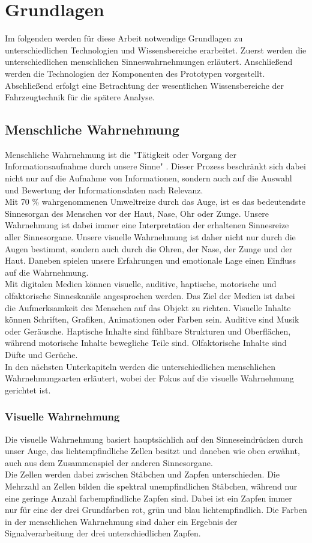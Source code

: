 \chapter{Grundlagen}
\label{cha:Grundlagen}
Im folgenden werden für diese Arbeit notwendige Grundlagen zu unterschiedlichen Technologien und Wissensbereiche erarbeitet. Zuerst werden die unterschiedlichen menschlichen Sinneswahrnehmungen erläutert. Anschließend werden die Technologien der Komponenten des Prototypen vorgestellt. Abschließend erfolgt eine Betrachtung der wesentlichen Wissensbereiche der Fahrzeugtechnik für die spätere Analyse.
\section{Menschliche Wahrnehmung}
Menschliche Wahrnehmung ist die "Tätigkeit oder Vorgang der Informationsaufnahme durch unsere Sinne" \cite[Seite 12]{Buhler.2017}. Dieser Prozess beschränkt sich dabei nicht nur auf die Aufnahme von Informationen, sondern auch auf die Auswahl und Bewertung der Informationsdaten nach Relevanz. \cite[Vgl. Seite 12]{Buhler.2017}\\
Mit 70 \% wahrgenommenen Umweltreize durch das Auge, ist es das bedeutendste Sinnesorgan des Menschen vor der Haut, Nase, Ohr oder Zunge. Unsere Wahrnehmung ist dabei immer eine Interpretation der erhaltenen Sinnesreize aller Sinnesorgane. Unsere visuelle Wahrnehmung ist daher nicht nur durch die Augen bestimmt, sondern auch durch die Ohren, der Nase, der Zunge und der Haut. Daneben spielen unsere Erfahrungen und emotionale Lage einen Einfluss auf die Wahrnehmung. \cite[Vgl. Seite 13 f.]{Buhler.2017}\\
Mit digitalen Medien können visuelle, auditive, haptische, motorische und olfaktorische Sinneskanäle angesprochen werden. Das Ziel der Medien ist dabei die Aufmerksamkeit des Menschen auf das Objekt zu richten. Visuelle Inhalte können Schriften, Grafiken, Animationen oder Farben sein. Auditive sind Musik oder Geräusche. Haptische Inhalte sind fühlbare Strukturen und Oberflächen, während motorische Inhalte bewegliche Teile sind. Olfaktorische Inhalte sind Düfte und Gerüche. \cite[Vgl. Seite 3]{Buhler.2017}\\
In den nächsten Unterkapiteln werden die unterschiedlichen menschlichen Wahrnehmungsarten erläutert, wobei der Fokus auf die visuelle Wahrnehmung gerichtet ist.
\subsection{Visuelle Wahrnehmung}
Die visuelle Wahrnehmung basiert hauptsächlich auf den Sinneseindrücken durch unser Auge, das lichtempfindliche Zellen besitzt und daneben wie oben erwähnt, auch aus dem Zusammenspiel der anderen Sinnesorgane.\\
Die Zellen werden dabei zwischen Stäbchen und Zapfen unterschieden. Die Mehrzahl an Zellen bilden die spektral unempfindlichen Stäbchen, während nur eine geringe Anzahl farbempfindliche Zapfen sind. Dabei ist ein Zapfen immer nur für eine der drei Grundfarben rot, grün und blau lichtempfindlich. Die Farben in der menschlichen Wahrnehmung sind daher ein Ergebnis der Signalverarbeitung der drei unterschiedlichen Zapfen. \cite[Vgl. Seite 14]{Buhler.2017}

